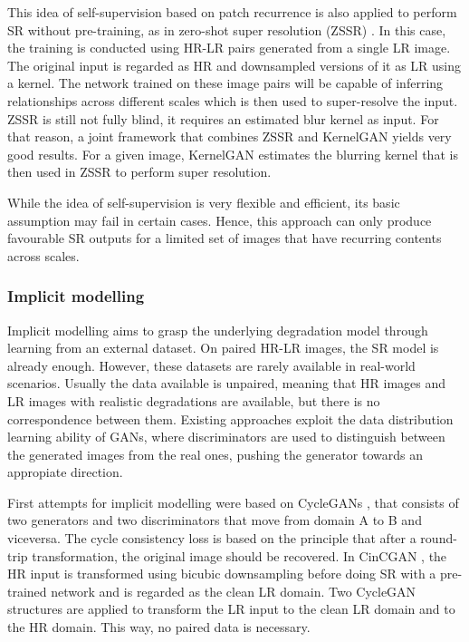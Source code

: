         This idea of self-supervision based on patch recurrence is also applied to perform SR without pre-training, as in zero-shot super resolution (ZSSR) \cite{shocher2017zeroshot}.
        In this case, the training is conducted using HR-LR pairs generated from a single LR image.
        The original input is regarded as HR and downsampled versions of it as LR using a kernel. 
        The network trained on these image pairs will be capable of inferring relationships across different scales which is then used to super-resolve the input.
        ZSSR is still not fully blind, it requires an estimated blur kernel as input. 
        For that reason, a joint framework that combines ZSSR and KernelGAN yields very good results.
        For a given image, KernelGAN estimates the blurring kernel that is then used in ZSSR to perform super resolution.

        While the idea of self-supervision is very flexible and efficient, its basic assumption may fail in certain cases.
        Hence, this approach can only produce favourable SR outputs for a limited set of images that have recurring contents across scales.



        \subsubsection{Implicit modelling} \label{subsubsec:implicit-modelling}

        Implicit modelling aims to grasp the underlying degradation model through learning from an external dataset.
        On paired HR-LR images, the SR model is already enough. However, these datasets are rarely available in real-world scenarios.
        Usually the data available is unpaired, meaning that HR images and LR images with realistic degradations are available, but there is no correspondence between them.
        Existing approaches exploit the data distribution learning ability of GANs, where discriminators are used to distinguish between the generated images from the real ones, pushing the generator towards an appropiate direction.
        
        First attempts for implicit modelling were based on CycleGANs \cite{CycleGAN2017}, that consists of two generators and two discriminators that move from domain A to B and viceversa. 
        The cycle consistency loss is based on the principle that after a round-trip transformation, the original image should be recovered.
        In CinCGAN \cite{yuan2018unsupervised}, the HR input is transformed using bicubic downsampling before doing SR with a pre-trained network and is regarded as the clean LR domain.
        Two CycleGAN structures are applied to transform the LR input to the clean LR domain and to the HR domain. 
        This way, no paired data is necessary.

